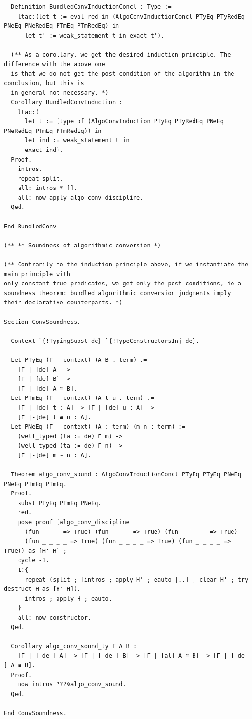 \documentclass[10pt,a4paper]{amsart}
\begin{document}
\begin{lstlisting}
  Definition BundledConvInductionConcl : Type :=
    ltac:(let t := eval red in (AlgoConvInductionConcl PTyEq PTyRedEq PNeEq PNeRedEq PTmEq PTmRedEq) in
      let t' := weak_statement t in exact t').

  (** As a corollary, we get the desired induction principle. The difference with the above one
  is that we do not get the post-condition of the algorithm in the conclusion, but this is
  in general not necessary. *)
  Corollary BundledConvInduction :
    ltac:(
      let t := (type of (AlgoConvInduction PTyEq PTyRedEq PNeEq PNeRedEq PTmEq PTmRedEq)) in
      let ind := weak_statement t in
      exact ind).
  Proof.
    intros.
    repeat split.
    all: intros * [].
    all: now apply algo_conv_discipline.
  Qed.

End BundledConv.

(** ** Soundness of algorithmic conversion *)

(** Contrarily to the induction principle above, if we instantiate the main principle with
only constant true predicates, we get only the post-conditions, ie a soundness theorem: bundled algorithmic conversion judgments imply their declarative counterparts. *)

Section ConvSoundness.

  Context `{!TypingSubst de} `{!TypeConstructorsInj de}.

  Let PTyEq (Γ : context) (A B : term) :=
    [Γ |-[de] A] ->
    [Γ |-[de] B] ->
    [Γ |-[de] A ≅ B].
  Let PTmEq (Γ : context) (A t u : term) :=
    [Γ |-[de] t : A] -> [Γ |-[de] u : A] ->
    [Γ |-[de] t ≅ u : A].
  Let PNeEq (Γ : context) (A : term) (m n : term) :=
    (well_typed (ta := de) Γ m) ->
    (well_typed (ta := de) Γ n) ->
    [Γ |-[de] m ~ n : A].

  Theorem algo_conv_sound : AlgoConvInductionConcl PTyEq PTyEq PNeEq PNeEq PTmEq PTmEq.
  Proof.
    subst PTyEq PTmEq PNeEq.
    red.
    pose proof (algo_conv_discipline 
      (fun _ _ _ => True) (fun _ _ _ => True) (fun _ _ _ _ => True)
      (fun _ _ _ _ => True) (fun _ _ _ _ => True) (fun _ _ _ _ => True)) as [H' H] ;
    cycle -1.
    1:{
      repeat (split ; [intros ; apply H' ; eauto |..] ; clear H' ; try destruct H as [H' H]).
      intros ; apply H ; eauto. 
    }
    all: now constructor.
  Qed.

  Corollary algo_conv_sound_ty Γ A B :
    [Γ |-[ de ] A] -> [Γ |-[ de ] B] -> [Γ |-[al] A ≅ B] -> [Γ |-[ de ] A ≅ B].
  Proof.
    now intros ???%algo_conv_sound.
  Qed.

End ConvSoundness.


\end{lstlisting}
\end{document}
